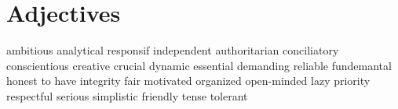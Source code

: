 \section{Adjectives}
   {ambitious}
   {analytical}
   {responsif}
   {independent}
   {authoritarian}
   {conciliatory}
   {conscientious}
   {creative}
   {crucial}
   {dynamic}
   {essential}
   {demanding}
   {reliable}
   {fundemantal}
   {honest}
   {to have integrity}
   {fair}
   {motivated}
   {organized}
   {open-minded}
   {lazy}
   {priority}
   {respectful}
   {serious}
   {simplistic}
   {friendly}
   {tense}
   {tolerant}

